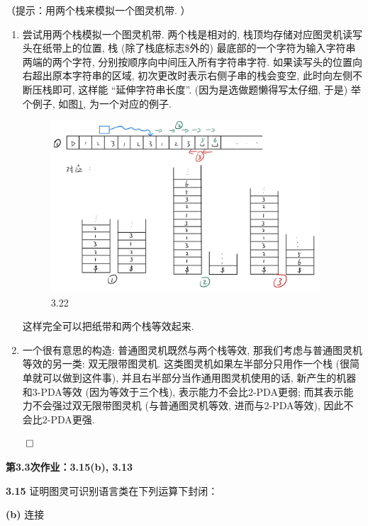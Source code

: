 \documentclass[UTF8]{report}
\newcommand{\problem}[1]{{\setlength{\parskip}{10pt}\noindent \bf{#1}}}
\renewenvironment{proof}{{\setlength{\parskip}{7pt}\noindent\hskip 2em \bf 证明 \quad}}{\hfill$\qed$\par}
\begin{document}
（提示：用两个栈来模拟一个图灵机带. ）

\begin{proof}
    \begin{enumerate}
        \item 尝试用两个栈模拟一个图灵机带. 两个栈是相对的, 栈顶均存储对应图灵机读写头在纸带上的位置, 栈 (除了栈底标志\$外的) 最底部的一个字符为输入字符串两端的两个字符, 分别按顺序向中间压入所有字符串字符. 如果读写头的位置向右超出原本字符串的区域, 初次更改时表示右侧子串的栈会变空, 此时向左侧不断压栈即可, 这样能 ``延伸字符串长度''. (因为是选做题懒得写太仔细, 于是) 举个例子, 如图\ref{fig:3_22}, 为一个对应的例子.

        \begin{figure}[!htbp]
            \centering
            \includegraphics[width=10cm]{image/3.22.png}
            \caption{3.22}
            \label{fig:3_22}
        \end{figure}

        这样完全可以把纸带和两个栈等效起来.

        \item 一个很有意思的构造: 普通图灵机既然与两个栈等效, 那我们考虑与普通图灵机等效的另一类: 双无限带图灵机. 这类图灵机如果左半部分只用作一个栈 (很简单就可以做到这件事), 并且右半部分当作通用图灵机使用的话, 新产生的机器和$3$-PDA等效 (因为等效于三个栈), 表示能力不会比$2$-PDA更弱; 而其表示能力不会强过双无限带图灵机 (与普通图灵机等效, 进而与$2$-PDA等效), 因此不会比$2$-PDA更强. 
    \end{enumerate}
\end{proof}






\newpage


\textbf{第3.3次作业：3.15(b), 3.13}


\problem{3.15} 证明图灵可识别语言类在下列运算下封闭：

\problem{(b)} 连接
\end{document}
